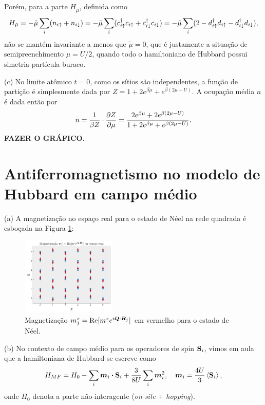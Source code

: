 \documentclass[a4paper,10pt]{article}
\begin{document}
Porém, para a parte $H_{\tilde{\mu}}$, definida como
$$
H_{\tilde{\mu}} =
-\tilde{\mu} \sum_{i} (n_{i\up} + n_{i\down}) =
-\tilde{\mu} \sum_{i} (c_{i\up}^\d c_{i\up} + c_{i\down}^\d c_{i\down}) =
-\tilde{\mu} \sum_{i} (2 - d_{i\up}^\d d_{i\up} - d_{i\down}^\d d_{i\down}),
$$
não se mantém invariante a menos que $\tilde{\mu} = 0$, que é justamente a situação de semipreenchimento $\mu = U/2$, quando todo o hamiltoniano de Hubbard possui simetria partícula-buraco.

\n

(c) No limite atômico $t = 0$, como os sítios são independentes, a função de partição é simplesmente dada por $Z = 1 + 2 e^{\beta \mu} + e^{\beta(2\mu - U)}$. A ocupação média $n$ é dada então por
$$
n = \frac{1}{\beta Z} \cdot \pdv{Z}{\mu} =
\frac{2 e^{\beta\mu} + 2 e^{\beta(2\mu-U)}}{1 + 2 e^{\beta \mu} + e^{\beta(2\mu - U)}}.
$$
\textbf{FAZER O GRÁFICO.}




\pagebreak

\section{Antiferromagnetismo no modelo de Hubbard em campo médio}

(a) A magnetização no espaço real para o estado de Néel na rede quadrada é esboçada na Figura \ref{fig:mag-neel}:
\begin{figure}[H]
\centering
\includegraphics[width=0.4\textwidth]{fig/magnetization-real_space.png}
\caption{Magnetização $m^z_j = \Re[m^z e^{i \bm{Q} \vdot \bm{R}_j}]$ em vermelho para o estado de Néel.}
\label{fig:mag-neel}
\end{figure}

(b) No contexto de campo médio para os operadores de spin $\S_i$, vimos em aula que a hamiltoniana de Hubbard se escreve como
$$
H_{MF} = H_0 - \sum_{i} \bm{m}_i \vdot \S_i + \frac{3}{8U} \sum_{i} \bm{m}_i^2, \quad
\bm{m}_i = \frac{4U}{3} \ev{\S_i},
$$
onde $H_0$ denota a parte não-interagente (\textit{on-site} + \textit{hopping}).
\end{document}
